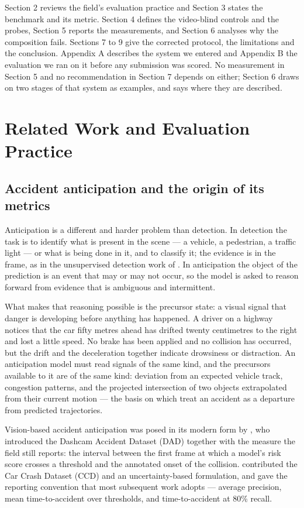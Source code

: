 Section 2 reviews the field's evaluation practice and Section 3 states the benchmark and its metric. Section 4 defines the video-blind controls and the probes, Section 5 reports the measurements, and Section 6 analyses why the composition fails. Sections 7 to 9 give the corrected protocol, the limitations and the conclusion. Appendix A describes the system we entered and Appendix B the evaluation we ran on it before any submission was scored. No measurement in Section 5 and no recommendation in Section 7 depends on either; Section 6 draws on two stages of that system as examples, and says where they are described.


\section{Related Work and Evaluation Practice}

\subsection{Accident anticipation and the origin of its metrics}
Anticipation is a different and harder problem than detection. In detection the task is to identify what is present in the scene --- a vehicle, a pedestrian, a traffic light --- or what is being done in it, and to classify it; the evidence is in the frame, as in the unsupervised detection work of \citet{liu2026sctnet}. In anticipation the object of the prediction is an event that may or may not occur, so the model is asked to reason forward from evidence that is ambiguous and intermittent.

What makes that reasoning possible is the precursor state: a visual signal that danger is developing before anything has happened. A driver on a highway notices that the car fifty metres ahead has drifted twenty centimetres to the right and lost a little speed. No brake has been applied and no collision has occurred, but the drift and the deceleration together indicate drowsiness or distraction. An anticipation model must read signals of the same kind, and the precursors available to it are of the same kind: deviation from an expected vehicle track, congestion patterns, and the projected intersection of two objects extrapolated from their current motion --- the basis on which \citet{yao2019unsupervised} treat an accident as a departure from predicted trajectories.

Vision-based accident anticipation was posed in its modern form by \citet{chan2016dad}, who introduced the Dashcam Accident Dataset (DAD) together with the measure the field still reports: the interval between the first frame at which a model's risk score crosses a threshold and the annotated onset of the collision. \citet{bao2020ccd} contributed the Car Crash Dataset (CCD) and an uncertainty-based formulation, and \citet{karim2022dsta} gave the reporting convention that most subsequent work adopts --- average precision, mean time-to-accident over thresholds, and time-to-accident at 80\% recall.

